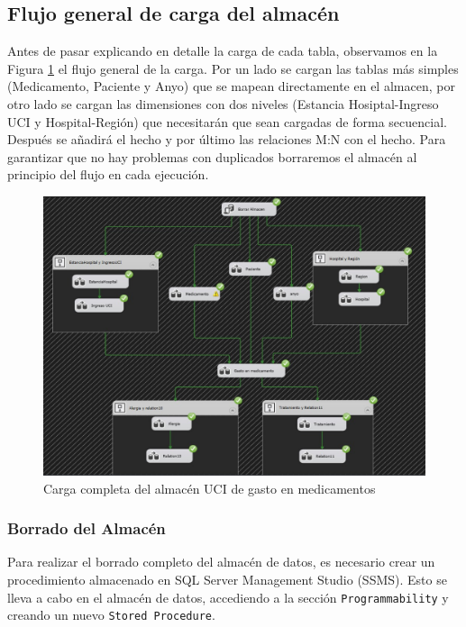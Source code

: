 \documentclass{article}
\begin{document}
	\subsection{Flujo general de carga del almacén}
	Antes de pasar explicando en detalle la carga de cada tabla, observamos en la Figura \ref{fig:flujo_general} el flujo general de la carga. Por un lado se cargan las tablas más simples (Medicamento, Paciente y Anyo) que se mapean directamente en el almacen, por otro lado se cargan las dimensiones con dos niveles (Estancia Hosiptal-Ingreso UCI y Hospital-Región) que necesitarán que sean cargadas de forma secuencial. Después se añadirá el hecho y por último las relaciones M:N con el hecho. Para garantizar que no hay problemas con duplicados borraremos el almacén al principio del flujo en cada ejecución.
	\begin{figure}[H]
		\centering
		\label{fig:flujo_general}
		\includegraphics[width=\linewidth]{./images/completados/flujo_completo_uci.jpeg}
		\caption{Carga completa del almacén UCI de gasto en medicamentos}
	\end{figure}
	\subsubsection{Borrado del Almacén}
	
	Para realizar el borrado completo del almacén de datos, es necesario crear un procedimiento almacenado en SQL Server Management Studio (SSMS). Esto se lleva a cabo en el almacén de datos, accediendo a la sección \texttt{Programmability} y creando un nuevo \texttt{Stored Procedure}. \\
	
\end{document}
